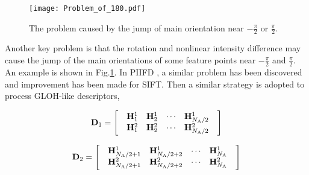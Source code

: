 \begin{figure}[h!]
 \begin{center}
  \texttt{[image: Problem\_of\_180.pdf]}
  \caption{The problem caused by the jump of main orientation near $-\frac{\pi}{2}$ or $\frac{\pi}{2}$.}
  \label{fig:des180}
 \end{center}
\end{figure}

Another key problem is that the rotation and nonlinear intensity difference may cause the jump of the main orientations of some feature points near $-\frac{\pi}{2}$ and $\frac{\pi}{2}$. An example is shown in Fig.\ref{fig:des180}. In PIIFD \cite{chen2010partial}, a similar problem has been discovered and improvement has been made for SIFT. Then a similar strategy is adopted to process GLOH-like descriptors,

\begin{equation}
{{\bf{D}}_1} = \left[ {\begin{array}{*{20}{c}}
{\begin{array}{*{20}{c}}
{{\bf{H}}_1^1}&{{\bf{H}}_2^1}& \cdots &{{\bf{H}}_{{{{N_{\rm{A}}}} \mathord{\left/
 {\vphantom {{{N_{\rm{A}}}} 2}} \right.
 \kern-\nulldelimiterspace} 2}}^1}
\end{array}}\\
{\begin{array}{*{20}{c}}
{{\bf{H}}_1^2}&{{\bf{H}}_2^2}& \cdots &{{\bf{H}}_{{{{N_{\rm{A}}}} \mathord{\left/
 {\vphantom {{{N_{\rm{A}}}} 2}} \right.
 \kern-\nulldelimiterspace} 2}}^2}
\end{array}}
\end{array}} \right]
\end{equation}

\begin{equation}
{{\bf{D}}_2} = \left[ {\begin{array}{*{20}{c}}
{\begin{array}{*{20}{c}}
{{\bf{H}}_{{{{N_{\rm{A}}}} \mathord{\left/
 {\vphantom {{{N_{\rm{A}}}} 2}} \right.
 \kern-\nulldelimiterspace} 2} + 1}^1}&{{\bf{H}}_{{{{N_{\rm{A}}}} \mathord{\left/
 {\vphantom {{{N_{\rm{A}}}} 2}} \right.
 \kern-\nulldelimiterspace} 2} + 2}^1}& \cdots &{{\bf{H}}_{{N_{\rm{A}}}}^1}
\end{array}}\\
{\begin{array}{*{20}{c}}
{{\bf{H}}_{{{{N_{\rm{A}}}} \mathord{\left/
 {\vphantom {{{N_{\rm{A}}}} 2}} \right.
 \kern-\nulldelimiterspace} 2} + 1}^2}&{{\bf{H}}_{{{{N_{\rm{A}}}} \mathord{\left/
 {\vphantom {{{N_{\rm{A}}}} 2}} \right.
 \kern-\nulldelimiterspace} 2} + 2}^2}& \cdots &{{\bf{H}}_{{N_{\rm{A}}}}^2}
\end{array}}
\end{array}} \right]
\end{equation}

